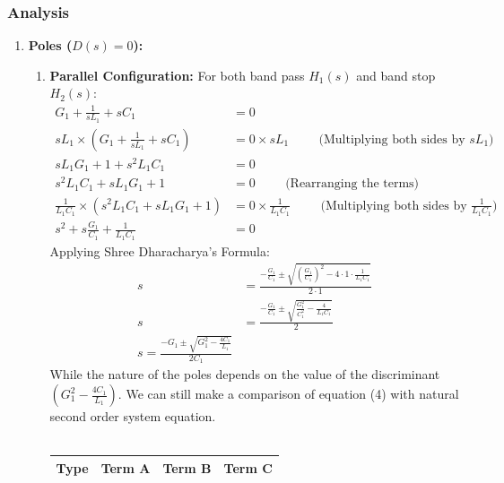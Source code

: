 \subsubsection{Analysis}
\begin{enumerate}
  \item \textbf{Poles (\(D(s) = 0\)):} \\
    \begin{enumerate}
      \item \textbf{Parallel Configuration:}
        For both band pass \(H_1(s)\) and band stop \(H_2(s)\):
        \begin{align*}
          G_1 + \frac{1}{sL_1} + sC_1 &= 0 \\
          sL_1 \times \left( G_1 + \frac{1}{sL_1} + sC_1 \right) &= 0 \times sL_1 \hspace{1cm} \text{(Multiplying both sides by \(sL_1\))} \\
          sL_1 G_1 + 1 + s^2 L_1 C_1 &= 0 \\
          s^2 L_1 C_1 + s L_1 G_1 + 1 &= 0 \hspace{1cm} \text{(Rearranging the terms)} \\
          \frac{1}{L_1 C_1} \times \left( s^2 L_1 C_1 + s L_1 G_1 + 1 \right) &= 0 \times \frac{1}{L_1 C_1} \hspace{1cm} \text{(Multiplying both sides by \(\frac{1}{L_1 C_1}\))} \\
          s^2 + s \frac{G_1}{C_1} + \frac{1}{L_1 C_1} &= 0 \tag{4}
        \end{align*}
        Applying Shree Dharacharya's Formula:
        \begin{align*}
          s &= \frac{-\frac{G_1}{C_1} \pm \sqrt{\left(\frac{G_1}{C_1}\right)^2 - 4 \cdot 1 \cdot \frac{1}{L_1 C_1}}}{2 \cdot 1} \\
          s &= \frac{-\frac{G_1}{C_1} \pm \sqrt{\frac{G_1^2}{C_1^2} - \frac{4}{L_1 C_1}}}{2} \\
          s = \frac{-G_1 \pm \sqrt{G_1^2 - \frac{4 C_1}{L_1}}}{2 C_1}
        \end{align*}
        While the nature of the poles depends on the value of the
        discriminant \(\left(G_1^2 - \frac{4 C_1}{L_1}\right)\).
        We can still make a comparison of equation (4) with natural
        second order system equation.\\ \\
        \begin{tabularx}{\linewidth}{|X|X|X|X|} \hline
          Type & Term A & Term B & Term C \\ \hline

\end{tabularx}
\end{enumerate}
\end{enumerate}
